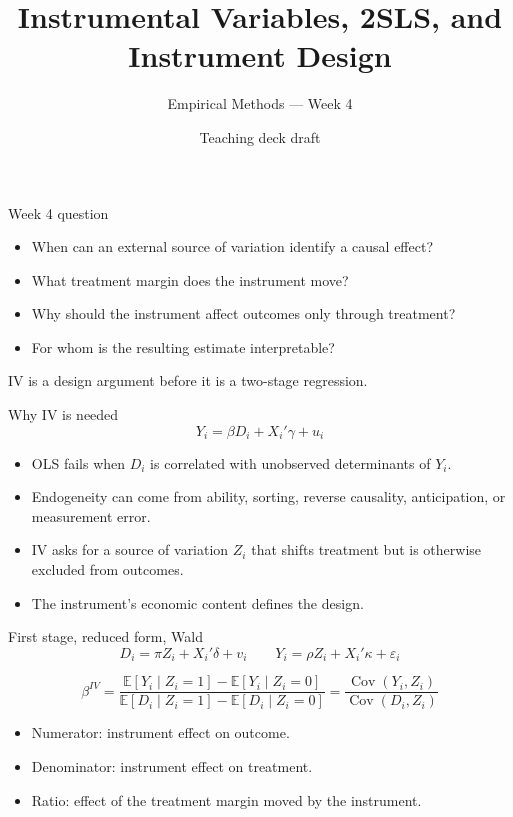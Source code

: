 \documentclass[aspectratio=169,11pt]{beamer}
\title{Instrumental Variables, 2SLS, and Instrument Design}
\subtitle{Empirical Methods --- Week 4}
\author{Teaching deck draft}
\date{}
\newcommand{\E}{\mathbb{E}}
\newcommand{\Cov}{\operatorname{Cov}}
\newcommand{\1}{\mathbf{1}}
\begin{document}
\begin{frame}
  \titlepage
\end{frame}

\begin{frame}{Week 4 question}
\begin{itemize}
    \item When can an external source of variation identify a causal effect?
    \item What treatment margin does the instrument move?
    \item Why should the instrument affect outcomes only through treatment?
    \item For whom is the resulting estimate interpretable?
\end{itemize}

\medskip
IV is a design argument before it is a two-stage regression.
\end{frame}

\begin{frame}{Why IV is needed}
\[
Y_i = \beta D_i + X_i'\gamma + u_i
\]

\begin{itemize}
    \item OLS fails when $D_i$ is correlated with unobserved determinants of $Y_i$.
    \item Endogeneity can come from ability, sorting, reverse causality, anticipation, or measurement error.
    \item IV asks for a source of variation $Z_i$ that shifts treatment but is otherwise excluded from outcomes.
    \item The instrument's economic content defines the design.
\end{itemize}
\end{frame}

\begin{frame}{First stage, reduced form, Wald}
\[
D_i = \pi Z_i + X_i'\delta + v_i
\qquad
Y_i = \rho Z_i + X_i'\kappa + \varepsilon_i
\]

\[
\beta^{IV}
=
\frac{\E[Y_i\mid Z_i=1]-\E[Y_i\mid Z_i=0]}
{\E[D_i\mid Z_i=1]-\E[D_i\mid Z_i=0]}
=
\frac{\Cov(Y_i,Z_i)}{\Cov(D_i,Z_i)}
\]

\begin{itemize}
    \item Numerator: instrument effect on outcome.
    \item Denominator: instrument effect on treatment.
    \item Ratio: effect of the treatment margin moved by the instrument.
\end{itemize}
\end{frame}
\end{document}
